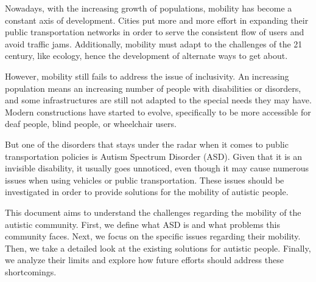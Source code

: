 
Nowadays, with the increasing growth of populations, mobility has become a constant axis of development. Cities put more and more effort in expanding their public transportation networks in order to serve the consistent flow of users and avoid traffic jams. Additionally, mobility must adapt to the challenges of the 21 century, like ecology, hence the development of alternate ways to get about.

However, mobility still fails to address the issue of inclusivity. An increasing population means an increasing number of people with disabilities or disorders, and some infrastructures are still not adapted to the special needs they may have. Modern constructions have started to evolve, specifically to be more accessible for deaf people, blind people, or wheelchair users.

But one of the disorders that stays under the radar when it comes to public transportation policies is Autism Spectrum Disorder (ASD). Given that it is an invisible disability, it usually goes unnoticed, even though it may cause numerous issues when using vehicles or public transportation. These issues should be investigated in order to provide solutions for the mobility of autistic people.

This document aims to understand the challenges regarding the mobility of the autistic community. First, we define what ASD is and what problems this community faces. Next, we focus on the specific issues regarding their mobility. Then, we take a detailed look at the existing solutions for autistic people. Finally, we analyze their limits and explore how future efforts should address these shortcomings.
